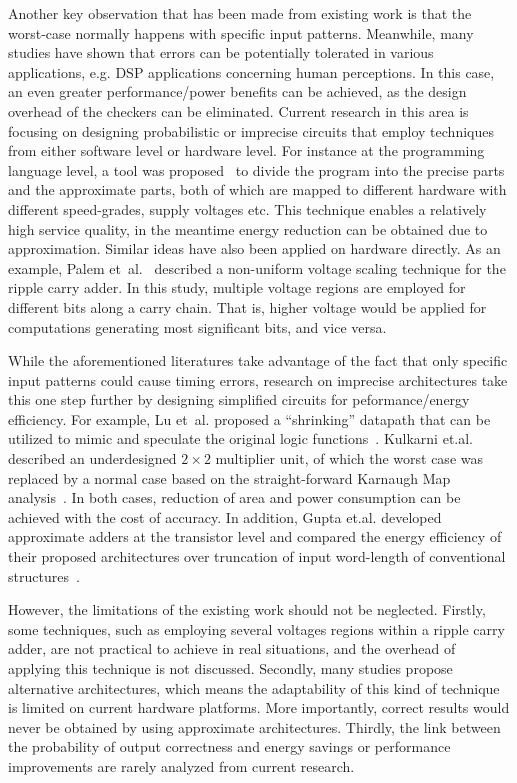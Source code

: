 \documentclass[journal]{IEEEtran}
\begin{document}
Another key observation that has been made from existing work is that the worst-case normally happens with specific input patterns. Meanwhile, many studies have shown that errors can be potentially tolerated in various applications, e.g. DSP applications concerning human perceptions. In this case, an even greater performance/power benefits can be achieved, as the design overhead of the checkers can be eliminated. Current research in this area is focusing on designing probabilistic or imprecise circuits that employ techniques from either software level or hardware level. For instance at the programming language level, a tool was proposed~\cite{EnerJ2011Uwash,Truffle2012Uwash} to divide the program into the precise parts and the approximate parts, both of which are mapped to different hardware with different speed-grades, supply voltages etc. This technique enables a relatively high service quality, in the meantime energy reduction can be obtained due to approximation. Similar ideas have also been applied on hardware directly. As an example, Palem et~al.~\cite{NonUniformScaling} described a non-uniform voltage scaling technique for the ripple carry adder. In this study, multiple voltage regions are employed for different bits along a carry chain. That is, higher voltage would be applied for computations generating most significant bits, and vice versa.

While the aforementioned literatures take advantage of the fact that only specific input patterns could cause timing errors, research on imprecise architectures take this one step further by designing simplified circuits for peformance/energy efficiency. For example, Lu et~al. proposed a ``shrinking'' datapath that can be utilized to mimic and speculate the original logic functions~\cite{IntelSpeeding}. Kulkarni et.al. described an underdesigned $2\times2$ multiplier unit, of which the worst case was replaced by a normal case based on the straight-forward Karnaugh Map analysis~\cite{Undersigned2x2multiplier}. In both cases, reduction of area and power consumption can be achieved with the cost of accuracy. In addition, Gupta et.al. developed approximate adders at the transistor level and compared the energy efficiency of their proposed architectures over truncation of input word-length of conventional structures~\cite{Gupta2013TransCADICS}.

However, the limitations of the existing work should not be neglected. Firstly, some techniques, such as employing several voltages regions within a ripple carry adder, are not practical to achieve in real situations, and the overhead of applying this technique is not discussed. Secondly, many studies propose alternative architectures, which means the adaptability of this kind of technique is limited on current hardware platforms. More importantly, correct results would never be obtained by using approximate architectures. Thirdly, the link between the probability of output correctness and energy savings or performance improvements are rarely analyzed from current research.
\end{document}

